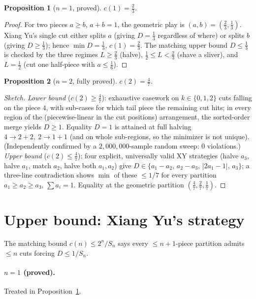 \documentclass[11pt]{article}
\newtheorem{proposition}{Proposition}
\theoremstyle{remark}\newtheorem*{remark}{Remark}
\newcommand{\Sn}{S_{n}}
\begin{document}
\begin{proposition}[$n=1$, proved]\label{prop:n1}
$c(1)=\tfrac23$.
\end{proposition}
\begin{proof}
For two pieces $a\ge b$, $a+b=1$, the geometric play is $(a,b)=(\tfrac23,\tfrac13)$.
Xiang Yu's single cut either splits $a$ (giving $D=\tfrac13$ regardless of where) or
splits $b$ (giving $D\ge\tfrac13$); hence $\min D=\tfrac13$, $c(1)=\tfrac23$. The
matching upper bound $D\le\tfrac13$ is checked by the three regimes
$L\ge\tfrac23$ (halve), $\tfrac12\le L<\tfrac23$ (shave a sliver), and $L=\tfrac12$
(cut one half-piece with $a\le\tfrac16$).
\end{proof}

\begin{proposition}[$n=2$, fully proved]\label{prop:n2}
$c(2)=\tfrac47$.
\end{proposition}
\begin{proof}[Sketch]
\emph{Lower bound} ($c(2)\ge\tfrac47$): exhaustive casework on $k\in\{0,1,2\}$
cuts falling on the piece $4$, with sub-cases for which tail piece the remaining
cut hits; in every region of the (piecewise-linear in the cut positions)
arrangement, the sorted-order merge yields $D\ge1$. Equality $D=1$ is attained at
full halving $4\to2+2,\ 2\to1+1$ (and on whole sub-regions, so the minimizer is
not unique). (Independently confirmed by a $2{,}000{,}000$-sample random sweep:
$0$ violations.)
\emph{Upper bound} ($c(2)\le\tfrac47$): four explicit, universally valid XY
strategies (halve $a_3$, halve $a_1$, match $a_2$, halve both $a_1,a_2$) give
$D\in\{a_1-a_2,\,a_2-a_3,\,|2a_1-1|,\,a_3\}$; a three-line contradiction shows
$\min$ of these $\le1/7$ for every partition $a_1\ge a_2\ge a_3$, $\sum a_i=1$.
Equality at the geometric partition $(\tfrac47,\tfrac27,\tfrac17)$.
\end{proof}

\section{Upper bound: Xiang Yu's strategy}

The matching bound $c(n)\le2^n/\Sn$ says every $\le n+1$-piece partition admits
$\le n$ cuts forcing $D\le1/\Sn$.

\paragraph{$n=1$ (proved).} Treated in Proposition~\ref{prop:n1}.
\end{document}
